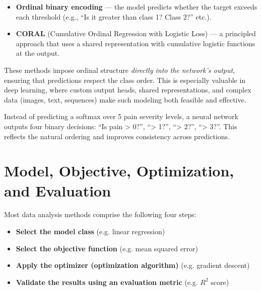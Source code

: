 \documentclass[12pt,openany]{book}
\begin{document}
\begin{itemize}
    \item \textbf{Ordinal binary encoding} — the model predicts whether the target exceeds each threshold (e.g., ``Is it greater than class 1? Class 2?'' etc.).
    \item \textbf{CORAL} (Cumulative Ordinal Regression with Logistic Loss) — a principled approach that uses a shared representation with cumulative logistic functions at the output.
\end{itemize}

These methods impose ordinal structure \emph{directly into the network’s output}, ensuring that predictions respect the class order. This is especially valuable in deep learning, where custom output heads, shared representations, and complex data (images, text, sequences) make such modeling both feasible and effective.

\begin{examplebox}
Instead of predicting a softmax over 5 pain severity levels, a neural network outputs four binary decisions: “Is pain \textgreater{} 0?”, “\textgreater{} 1?”, “\textgreater{} 2?”, “\textgreater{} 3?”. This reflects the natural ordering and improves consistency across predictions.
\end{examplebox}

\vspace{10pt}




\chapter{Model, Objective, Optimization, and Evaluation}

\begin{summarybox}
Most data analysis methods comprise the following four steps:
\begin{itemize}
    \item \textbf{Select the model class} (e.g. linear regression)
    \item \textbf{Select the objective function} (e.g. mean squared error)
    \item \textbf{Apply the optimizer (optimization algorithm)} (e.g. gradient descent)
    \item \textbf{Validate the results using an evaluation metric} (e.g. $R^2$ score)
\end{itemize}
\end{summarybox}
\end{document}
